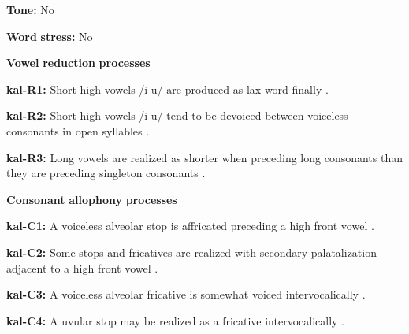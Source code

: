 \documentclass[output=paper]{langsci/langscibook}
\begin{document}
\begin{styleBody}
\textbf{Tone:} No
\end{styleBody}

\begin{styleBody}
\textbf{Word} \textbf{stress:} No
\end{styleBody}

\begin{styleBody}
\textbf{Vowel} \textbf{reduction} \textbf{processes}
\end{styleBody}

\begin{styleBody}
\textbf{kal-R1:}  Short high vowels /i u/ are produced as lax word-finally \citep[56-63]{Hagerup2011}.
\end{styleBody}

\begin{styleBody}
\textbf{kal-R2:} Short high vowels /i u/ tend to be devoiced between voiceless consonants in open syllables \citep[335]{Fortescue1984}.
\end{styleBody}

\begin{styleBody}
\textbf{kal-R3:} Long vowels are realized as shorter when preceding long consonants than they are preceding singleton consonants \citep[65]{Jacobsen2000}.
\end{styleBody}

\begin{styleBody}
\textbf{Consonant} \textbf{allophony} \textbf{processes}
\end{styleBody}

\begin{styleBody}
\textbf{kal-C1:} A voiceless alveolar stop is affricated preceding a high front vowel \citep[333]{Fortescue1984}.
\end{styleBody}

\begin{styleBody}
\textbf{kal-C2:} Some stops and fricatives are realized with secondary palatalization adjacent to a high front vowel \citep[333]{Fortescue1984}.
\end{styleBody}

\begin{styleBody}
\textbf{kal-C3:} A voiceless alveolar fricative is somewhat voiced intervocalically \citep[334]{Fortescue1984}.
\end{styleBody}

\begin{styleBody}
\textbf{kal-C4:} A uvular stop may be realized as a fricative intervocalically \citep[333]{Fortescue1984}.
\end{styleBody}
\end{document}
